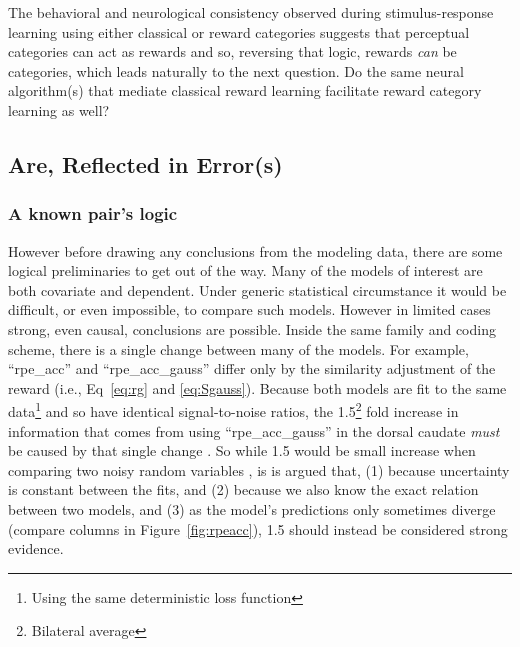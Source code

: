The behavioral and neurological consistency observed during stimulus-response learning using either classical or reward categories suggests that perceptual categories can act as rewards and so, reversing that logic, rewards \emph{can} be categories, which leads naturally to the next question. Do the same neural algorithm(s) that mediate classical reward learning facilitate reward category learning as well?

\subsection{Are, Reflected in Error(s)}
\label{sub:inerror}
\subsubsection{A known pair's logic}
\label{subsub:onestep}
However before drawing any conclusions from the modeling data, there are some logical preliminaries to get out of the way.  Many of the models of interest are both covariate and dependent.  Under generic statistical circumstance it would be difficult, or even impossible, to compare such models.  However in limited cases strong, even causal, conclusions are possible.   Inside the same family and coding scheme, there is a single change between many of the models.  For example, ``rpe\_acc'' and ``rpe\_acc\_gauss'' differ only by the similarity adjustment of the reward (i.e., Eq~\ref{eq:rg} and \ref{eq:Sgauss}).  Because both models are fit to the same data\footnote{
    Using the same deterministic loss function} and so have identical signal-to-noise ratios, the 1.5\footnote{Bilateral average} fold increase in information that comes from using ``rpe\_acc\_gauss'' in the dorsal caudate \emph{must} be caused by that single change \cite{Pearl:2010p9726}.  So while 1.5 would be small increase when comparing two noisy random variables \cite{Anderson:2000p9475,Forster:2000p9623}, is is argued that, (1) because uncertainty is constant between the fits, and (2) because we also know the exact relation between two models, and (3) as the model's predictions only sometimes diverge (compare columns in Figure~\ref{fig:rpeacc}), 1.5 should instead be considered strong evidence.

